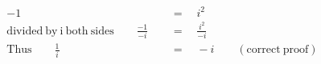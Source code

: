 \begin{align*}
-1\quad&\,=\quad i^2\\
\mathrm{divided~by~i~both~sides}\qquad\frac{-1}{-i}\quad&\,=\quad\frac{i^2}{-i}\\
\mathrm{Thus}\qquad\frac{1}{i}\quad&\,=\quad-i\qquad\mathrm{(correct~proof)}
\end{align*}
